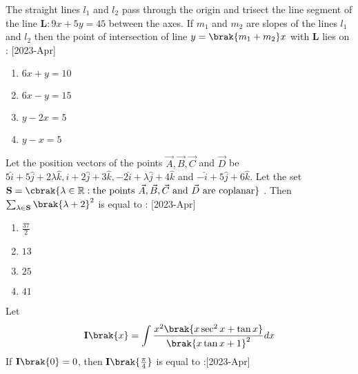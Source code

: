 \iffalse
    \title{2023}
    \author{EE24BTECH11011}
    \section{mcq-single}
\fi 
 \item The straight lines $l_1$ and $l_2$ pass through the origin and trisect the line segment of the line $\mathbf{L} : 9x + 5y = 45$ between the axes. If $m_1$ and $m_2$ are slopes of the lines $l_1$ and $l_2$ then the point of intersection of line $y = \brak{m_1 + m_2} x$ with $\mathbf{L}$ lies on : \hfill[2023-Apr]
    \begin{multicols}{2}
     \begin{enumerate}
         \item $6x + y = 10$
         \item $6x - y =15$\\
         \item $y - 2x = 5$
         \item $y - x =5$
     \end{enumerate}
    \end{multicols}
    \item Let the position vectors of the points $\vec{A} ,\vec{B}, \vec{C}$ and $\vec{D}$ be $5\hat{i}+5\hat{j}+2\lambda \hat{k} , \hat{i}+2\hat{j}+3\hat{k}, -2\hat{i}+\lambda \hat{j}+ 4\hat{k}$ and $-\hat{i}+5\hat{j}+6\hat{k}$. Let the set $\mathbf{S} = \cbrak{ \lambda \in \mathbb{R} : \text{the points } \vec{A} , \vec{B}, \vec{C} \text{ and } \vec{D} \text{ are coplanar}}$ . Then $\sum_{\lambda \in \mathbf{S}}\brak{\lambda + 2}^2$ is equal to : \hfill[2023-Apr]
    \begin{multicols}{2}
        \begin{enumerate}
            \item $\frac{37}{2}$\\
            \item $13$
            \item $25$\\
            \item $41$
        \end{enumerate}
    \end{multicols}
    \item Let 
    \begin{align}
        \mathbf{I}\brak{x} = \int{\frac{x^2 \brak{x \sec^2 x + \tan x}}{\brak{x \tan x +1}^2}dx}
    \end{align}
    If $\mathbf{I}\brak{0} = 0$, then $\mathbf{I}\brak{\frac{\pi}{4}}$ is equal to :\hfill[2023-Apr]

